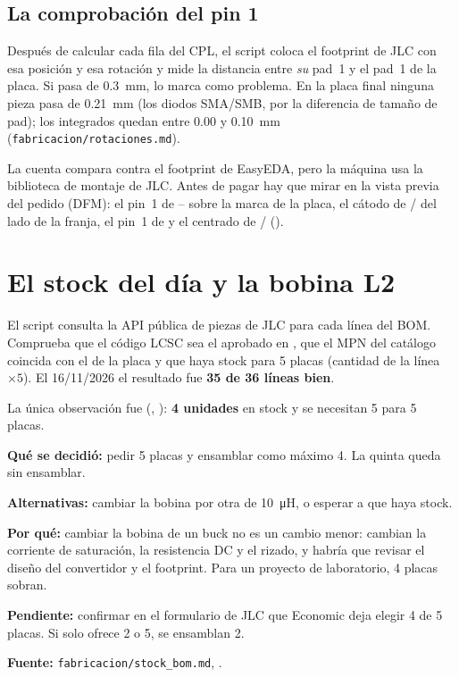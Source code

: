 \subsection{La comprobación del pin 1}

Después de calcular cada fila del CPL, el script coloca el footprint de JLC con esa posición y esa rotación y mide la distancia entre \emph{su} pad~1 y el pad~1 de la placa. Si pasa de \SI{0.3}{\milli\meter}, lo marca como problema. En la placa final ninguna pieza pasa de \SI{0.21}{\milli\meter} (los diodos SMA/SMB, por la diferencia de tamaño de pad); los integrados quedan entre \SI{0.00}{} y \SI{0.10}{\milli\meter} (\nolinkurl{fabricacion/rotaciones.md}).

\begin{ojo}
La cuenta compara contra el footprint de EasyEDA, pero la máquina usa la biblioteca de montaje de JLC. Antes de pagar hay que mirar en la vista previa del pedido (DFM): el pin~1 de -- sobre la marca de la placa, el cátodo de / del lado de la franja, el pin~1 de  y el centrado de / ().
\end{ojo}

\section{El stock del día y la bobina L2}\label{sec:c05-stock}

El script  consulta la API pública de piezas de JLC para cada línea del BOM. Comprueba que el código LCSC sea el aprobado en , que el MPN del catálogo coincida con el de la placa y que haya stock para 5 placas (cantidad de la línea $\times5$). El 16/11/2026 el resultado fue \textbf{35 de 36 líneas bien}.

La única observación fue  (, ): \textbf{4 unidades} en stock y se necesitan 5 para 5 placas.

\begin{decision}
\textbf{Qué se decidió:} pedir 5 placas y ensamblar como máximo 4. La quinta queda sin ensamblar.

\textbf{Alternativas:} cambiar la bobina por otra de \SI{10}{\micro\henry}, o esperar a que haya stock.

\textbf{Por qué:} cambiar la bobina de un buck no es un cambio menor: cambian la corriente de saturación, la resistencia DC y el rizado, y habría que revisar el diseño del convertidor y el footprint. Para un proyecto de laboratorio, 4 placas sobran.

\textbf{Pendiente:} confirmar en el formulario de JLC que Economic deja elegir 4 de 5 placas. Si solo ofrece 2 o 5, se ensamblan 2.

\textbf{Fuente:} \nolinkurl{fabricacion/stock_bom.md}, .
\end{decision}

